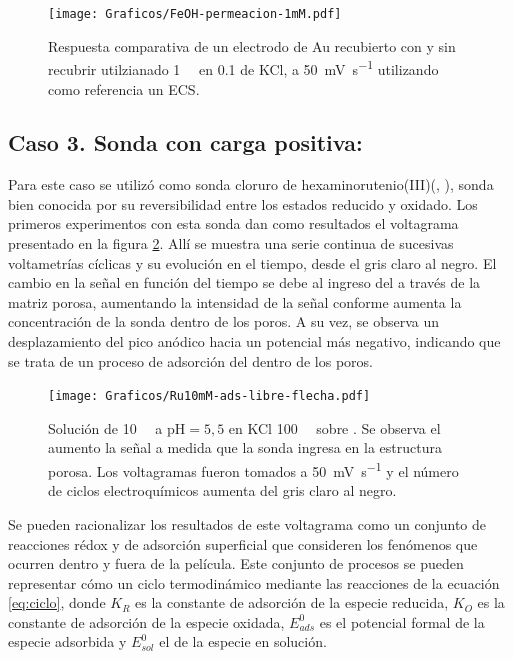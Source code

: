 		\begin{figure}[ht]
				\centering
		 	    \texttt{[image: Graficos/FeOH-permeacion-1mM.pdf]}
		        \caption[Permeación ferroceno metanol en \pdmF]{Respuesta comparativa de un electrodo de Au recubierto con \pdmF\space y sin recubrir utilzianado \fc\space \SI{1}{\milli\Molar} en \SI{0.1}{\Molar} de KCl, a \SI{50}{\milli\volt\per\second} utilizando como referencia un ECS.}
		        \label{fig:permeacion}
		      	\end{figure}

	\subsection{Caso 3. Sonda con carga positiva: \texorpdfstring{\aminorutenioCompleto}{aminorutenio}}

		Para este caso se utilizó como sonda cloruro de hexaminorutenio(III)\linebreak (\aminorutenioCompleto, \ru), sonda bien conocida por su reversibilidad entre los estados reducido y oxidado. Los primeros experimentos con esta sonda dan como resultados el voltagrama presentado en la figura \ref{fig:primero-Ru10mM}. Allí se muestra una serie continua de sucesivas voltametrías cíclicas y su evolución en el tiempo, desde el gris claro al negro. El cambio en la señal en función del tiempo se debe al ingreso del \ru\space a través de la matriz porosa, aumentando la intensidad de la señal conforme aumenta la concentración de la sonda dentro de los poros. A su vez, se observa un desplazamiento del pico anódico hacia un potencial más negativo, indicando que se trata de un proceso de adsorción del \ru\space dentro de los poros. 
					
				\begin{figure}[t]
				\centering
				\texttt{[image: Graficos/Ru10mM-ads-libre-flecha.pdf]}
		        \caption{Solución de \ru\space \SI{10}{\milli\Molar} a $\text{pH}=5,5$ en KCl \SI{100}{\milli\Molar} sobre \pdmF. Se observa el aumento la señal a medida que la sonda ingresa en la estructura porosa. Los voltagramas fueron tomados a \SI{50}{\milli\volt\per\second} y el número de ciclos electroquímicos aumenta del gris claro al negro.}
		        \label{fig:primero-Ru10mM}
		        \end{figure}

		Se pueden racionalizar los resultados de este voltagrama como un conjunto de reacciones rédox y de adsorción superficial que consideren los fenómenos que ocurren dentro y fuera de la película. Este conjunto de procesos se pueden representar cómo un ciclo termodinámico mediante las reacciones de la ecuación \ref{eq:ciclo}, donde $K_R$ es la constante de adsorción de la especie reducida, $K_O$ es la constante de adsorción de la especie oxidada, $E^0_{ads}$ es el potencial formal de la especie adsorbida y $E^0_{sol}$ el de la especie en solución.\cite{ybarra2007}

